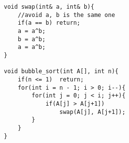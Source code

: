     
\begin{lstlisting}
void swap(int& a, int& b){
	//avoid a, b is the same one
	if(a == b) return; 
	a = a^b;
	b = a^b;
	a = a^b;
}

void bubble_sort(int A[], int n){
	if(n <= 1)	return;
	for(int i = n - 1; i > 0; i--){
		for(int j = 0; j < i; j++){
			if(A[j] > A[j+1])
				swap(A[j], A[j+1]);
		}
	}
}
\end{lstlisting}
